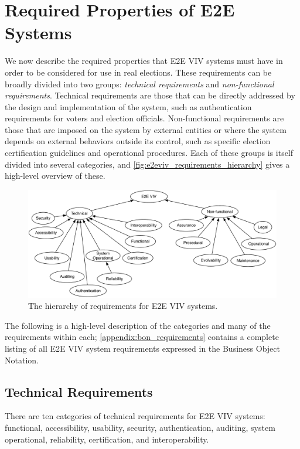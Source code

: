 \chapter{Required Properties of E2E Systems}
\label{chapter:required_properties}

We now describe the required properties that E2E VIV systems must have
in order to be considered for use in real elections. These
requirements can be broadly divided into two groups: \emph{technical
  requirements} and \emph{non-functional requirements}. Technical
requirements are those that can be directly addressed by the design
and implementation of the system, such as authentication requirements
for voters and election officials. Non-functional requirements are
those that are imposed on the system by external entities or where the
system depends on external behaviors outside its control, such as
specific election certification guidelines and operational
procedures. Each of these groups is itself divided into several
categories, and \autoref{fig:e2eviv_requirements_hierarchy} gives a
high-level overview of these.

\begin{figure}
\begin{center}
\includegraphics[width=6in]{required_properties_resources/hierarchy}
\end{center}
\caption{The hierarchy of requirements for E2E VIV systems.}
\label{fig:e2eviv_requirements_hierarchy}
\end{figure}

The following is a high-level description of the categories and many
of the requirements within each; \autoref{appendix:bon_requirements}
contains a complete listing of all E2E VIV system requirements
expressed in the Business Object Notation.

\section{Technical Requirements}
There are ten categories of technical requirements for E2E VIV
systems: functional, accessibility, usability, security,
authentication, auditing, system operational, reliability,
certification, and interoperability.

